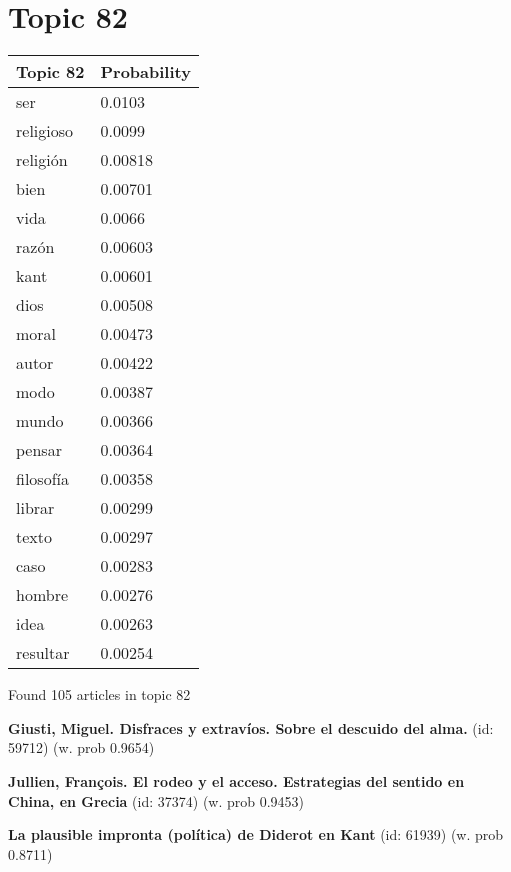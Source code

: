 \documentclass{article}
\begin{document}
\vfill
\newpage


\centering
\thispagestyle{empty}
\section*{Topic 82}\vfill
\begin{tabular}{ll}
\toprule
  Topic 82 & Probability \\
\midrule
       ser &      0.0103 \\
 religioso &      0.0099 \\
  religión &     0.00818 \\
      bien &     0.00701 \\
      vida &      0.0066 \\
     razón &     0.00603 \\
      kant &     0.00601 \\
      dios &     0.00508 \\
     moral &     0.00473 \\
     autor &     0.00422 \\
      modo &     0.00387 \\
     mundo &     0.00366 \\
    pensar &     0.00364 \\
 filosofía &     0.00358 \\
    librar &     0.00299 \\
     texto &     0.00297 \\
      caso &     0.00283 \\
    hombre &     0.00276 \\
      idea &     0.00263 \\
  resultar &     0.00254 \\
\bottomrule
\end{tabular}

\vfill
Found 105 articles in topic 82
\vfill

\textbf{Giusti, Miguel. Disfraces y extravíos. Sobre el descuido del alma.} (id: 59712)
 (w. prob 0.9654)
\vfill

\textbf{Jullien, François. El rodeo y el acceso. Estrategias del sentido en China, en Grecia} (id: 37374)
 (w. prob 0.9453)
\vfill

\textbf{La plausible impronta (política) de Diderot en Kant} (id: 61939)
 (w. prob 0.8711)

\vfill
\newpage


\centering
\thispagestyle{empty}
\end{document}
